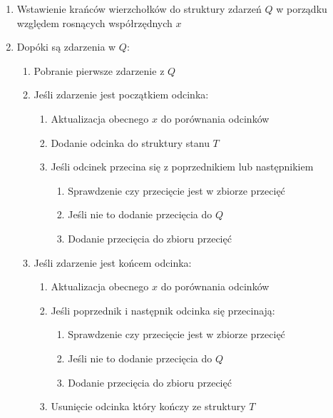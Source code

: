 \documentclass[a4paper]{article}
\begin{document}
\begin{enumerate}
    \item Wstawienie krańców wierzchołków do struktury zdarzeń $Q$ w porządku względem rosnących współrzędnych $x$
    \item Dopóki są zdarzenia w $Q$:
        \begin{enumerate}
            \item Pobranie pierwsze zdarzenie z $Q$
            \item Jeśli zdarzenie jest początkiem odcinka:
                \begin{enumerate}
                    \item Aktualizacja obecnego $x$ do porównania odcinków 
                    \item Dodanie odcinka do struktury stanu $T$
                    \item Jeśli odcinek przecina się z poprzednikiem lub następnikiem
                    \begin{enumerate}
                        \item Sprawdzenie czy przecięcie jest w zbiorze przecięć
                        \item Jeśli nie to dodanie przecięcia do $Q$
                        \item Dodanie przecięcia do zbioru przecięć
                    \end{enumerate}
                \end{enumerate}
            \item Jeśli zdarzenie jest końcem odcinka:
                \begin{enumerate}
                    \item Aktualizacja obecnego $x$ do porównania odcinków 
                    \item Jeśli poprzednik i następnik odcinka się przecinają:
                    \begin{enumerate}
                        \item Sprawdzenie czy przecięcie jest w zbiorze przecięć
                        \item Jeśli nie to dodanie przecięcia do $Q$
                        \item Dodanie przecięcia do zbioru przecięć
                    \end{enumerate}
                    \item Usunięcie odcinka który kończy ze struktury $T$
                \end{enumerate}

\end{enumerate}
\end{enumerate}
\end{document}
